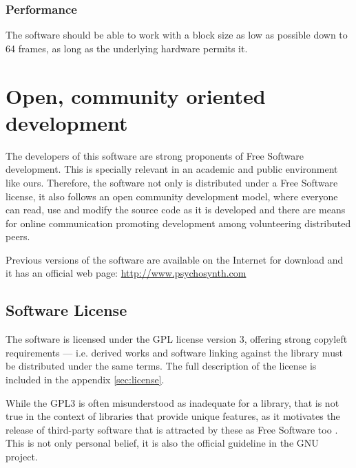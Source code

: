\subsubsection{Performance}

\begin{requirement}[Latency]
  The software should be able to work with a block size as low as
  possible down to 64 frames, as long as the underlying hardware
  permits it.
\end{requirement}


\section{Open, community oriented development}

The developers of this software are strong proponents of Free Software
development. This is specially relevant in an academic and public
environment like ours. Therefore, the software not only is distributed
under a Free Software license, it also follows an open community
development model, where everyone can read, use and modify the
source code as it is developed and there are means for online
communication promoting development among volunteering distributed
peers.

Previous versions of the software are available on the Internet for
download and it has an official web page:
\url{http://www.psychosynth.com}

\subsection{Software License}

The software is licensed under the GPL license version 3, offering
strong copyleft requirements --- i.e. derived works and software
linking against the library must be distributed under the same
terms. The full description of the license is included in the appendix
\ref{sec:license}.

While the GPL3 is often misunderstood as inadequate for a library,
that is not true in the context of libraries that provide unique
features, as it motivates the release of third-party software that is
attracted by these as Free Software too \cite{gnu99why}. This is not
only personal belief, it is also the official guideline in the GNU
project.

